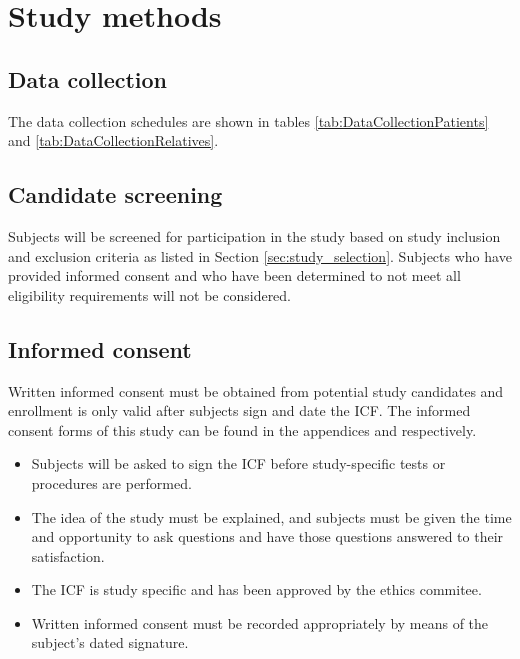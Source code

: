 \section{Study methods}
\subsection{Data collection}
The data collection schedules are shown in tables \ref{tab:DataCollectionPatients} and \ref{tab:DataCollectionRelatives}.

\subsection{Candidate screening}
\label{subsec:screening}
Subjects will be screened for participation in the study based on study inclusion and exclusion criteria as listed in Section \ref{sec:study_selection}. Subjects who have provided informed consent and who have been determined to not meet all eligibility requirements will not be considered.

\subsection{Informed consent}
Written informed consent must be obtained from potential study candidates and enrollment is only valid after subjects sign and date the \ac{ICF}. The informed consent forms of this study can be found in the appendices \label{sec:icf_patient} and \label{sec:icf_relative} respectively.

\begin{itemize}[noitemsep, topsep=0pt]
\item Subjects will be asked to sign the \ac{ICF} before study-specific tests or procedures are performed.
\item The idea of the study must be explained, and subjects must be given the time and opportunity to ask questions and have those questions answered to their satisfaction.
\item The \ac{ICF} is study specific and has been approved by the ethics commitee.
\item Written informed consent must be recorded appropriately by means of the subject’s dated signature.
\end{itemize}

